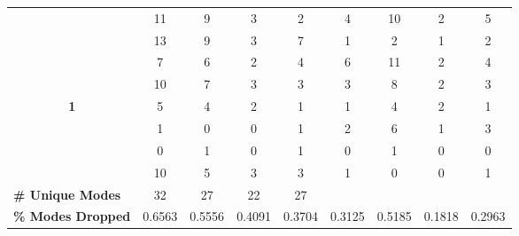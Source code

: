 \begin{table}[!htbp]
\begin{adjustbox}{angle=90}
\begin{tabular}{ccccccccc}
			\multicolumn{1}{c|}{} & \multicolumn{1}{c|}{11} & \multicolumn{1}{c|}{9} & \multicolumn{1}{c|}{3} & \multicolumn{1}{c|}{2} & \multicolumn{1}{c|}{4} & \multicolumn{1}{c|}{10} & \multicolumn{1}{c|}{2} & 5 \\
			\multicolumn{1}{c|}{} & \multicolumn{1}{c|}{13} & \multicolumn{1}{c|}{9} & \multicolumn{1}{c|}{3} & \multicolumn{1}{c|}{7} & \multicolumn{1}{c|}{1} & \multicolumn{1}{c|}{2} & \multicolumn{1}{c|}{1} & 2 \\
			\multicolumn{1}{c|}{} & \multicolumn{1}{c|}{7} & \multicolumn{1}{c|}{6} & \multicolumn{1}{c|}{2} & \multicolumn{1}{c|}{4} & \multicolumn{1}{c|}{6} & \multicolumn{1}{c|}{11} & \multicolumn{1}{c|}{2} & 4 \\
			\multicolumn{1}{c|}{} & \multicolumn{1}{c|}{10} & \multicolumn{1}{c|}{7} & \multicolumn{1}{c|}{3} & \multicolumn{1}{c|}{3} & \multicolumn{1}{c|}{3} & \multicolumn{1}{c|}{8} & \multicolumn{1}{c|}{2} & 3 \\ \hline
			\multicolumn{1}{c|}{\multirow{4}{*}{\textbf{1}}} & \multicolumn{1}{c|}{5} & \multicolumn{1}{c|}{4} & \multicolumn{1}{c|}{2} & \multicolumn{1}{c|}{1} & \multicolumn{1}{c|}{1} & \multicolumn{1}{c|}{4} & \multicolumn{1}{c|}{2} & 1 \\
			\multicolumn{1}{c|}{} & \multicolumn{1}{c|}{1} & \multicolumn{1}{c|}{0} & \multicolumn{1}{c|}{0} & \multicolumn{1}{c|}{1} & \multicolumn{1}{c|}{2} & \multicolumn{1}{c|}{6} & \multicolumn{1}{c|}{1} & 3 \\
			\multicolumn{1}{c|}{} & \multicolumn{1}{c|}{0} & \multicolumn{1}{c|}{1} & \multicolumn{1}{c|}{0} & \multicolumn{1}{c|}{1} & \multicolumn{1}{c|}{0} & \multicolumn{1}{c|}{1} & \multicolumn{1}{c|}{0} & 0 \\
			\multicolumn{1}{c|}{} & \multicolumn{1}{c|}{10} & \multicolumn{1}{c|}{5} & \multicolumn{1}{c|}{3} & \multicolumn{1}{c|}{3} & \multicolumn{1}{c|}{1} & \multicolumn{1}{c|}{0} & \multicolumn{1}{c|}{0} & 1 \\ \hline
			\multicolumn{1}{l|}{\textbf{\# Unique Modes}} & \multicolumn{1}{c|}{32} & \multicolumn{1}{c|}{27} & \multicolumn{1}{c|}{22} & \multicolumn{1}{c|}{27} & \multicolumn{1}{l|}{} & \multicolumn{1}{l|}{} & \multicolumn{1}{l|}{} & \multicolumn{1}{l}{} \\
			\multicolumn{1}{l|}{\textbf{\% Modes Dropped}} & \multicolumn{1}{c|}{0.6563} & \multicolumn{1}{c|}{0.5556} & \multicolumn{1}{c|}{0.4091} & \multicolumn{1}{c|}{0.3704} & \multicolumn{1}{c|}{0.3125} & \multicolumn{1}{c|}{0.5185} & \multicolumn{1}{c|}{0.1818} & \multicolumn{1}{c}{0.2963}
		\end{tabular}
	\end{adjustbox}
\end{table}


